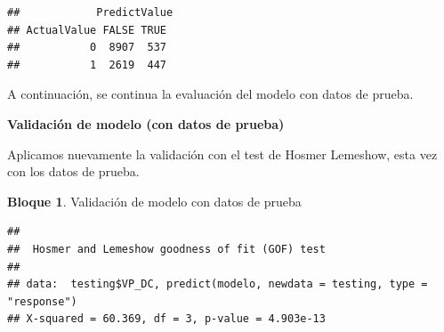 \documentclass[]{book}
\newenvironment{Shaded}{\begin{snugshade}}{\end{snugshade}}
\newcommand{\CommentTok}[1]{\textcolor[rgb]{0.56,0.35,0.01}{\textit{#1}}}
\newcommand{\DataTypeTok}[1]{\textcolor[rgb]{0.13,0.29,0.53}{#1}}
\newcommand{\DecValTok}[1]{\textcolor[rgb]{0.00,0.00,0.81}{#1}}
\newcommand{\KeywordTok}[1]{\textcolor[rgb]{0.13,0.29,0.53}{\textbf{#1}}}
\newcommand{\NormalTok}[1]{#1}
\newcommand{\OperatorTok}[1]{\textcolor[rgb]{0.81,0.36,0.00}{\textbf{#1}}}
\newcommand{\StringTok}[1]{\textcolor[rgb]{0.31,0.60,0.02}{#1}}
\theoremstyle{definition}
\theoremstyle{definition}
\newtheorem{example}{Bloque}[chapter]
\theoremstyle{definition}
\theoremstyle{definition}
\theoremstyle{remark}
\begin{document}
\begin{Shaded}
\end{Shaded}

\begin{verbatim}
##            PredictValue
## ActualValue FALSE TRUE
##           0  8907  537
##           1  2619  447
\end{verbatim}

A continuación, se continua la evaluación del modelo con datos de prueba.

\textbf{Validación de modelo (con datos de prueba)}

Aplicamos nuevamente la validación con el test de Hosmer Lemeshow, esta vez con los datos de prueba.

\begin{example}
\protect\hypertarget{exm:bloque21nbm}{}{\label{exm:bloque21nbm} }Validación de modelo con datos de prueba
\end{example}

\begin{Shaded}
\end{Shaded}

\begin{verbatim}
## 
##  Hosmer and Lemeshow goodness of fit (GOF) test
## 
## data:  testing$VP_DC, predict(modelo, newdata = testing, type = "response")
## X-squared = 60.369, df = 3, p-value = 4.903e-13
\end{verbatim}

\begin{Shaded}
\end{Shaded}
\end{document}
